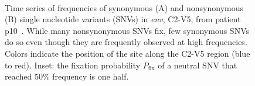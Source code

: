 \documentclass[11pt]{article}
\newcommand{\pfix}{P_{\mathrm{fix}}}
\newcommand{\env}{\textit{env}}
\newcommand{\shankaregion}{C2-V5}
\begin{document}




\begin{figure}
\begin{center}
\\
\caption{Time series of frequencies
of synonymous (A) and nonsynonymous (B) single nucleotide variants (SNVs) in \env, 
\shankaregion, from patient p10~\cite{shankarappa_consistent_1999}.
While many nonsynonymous SNVs fix, few synonymous
SNVs do so even though they are frequently observed at high
frequencies. Colors indicate the position of the site along the \shankaregion{} region
(blue to red). Inset: the fixation probability $\pfix$ of a neutral
SNV that reached 50\% frequency is one half.}
\label{fig:aft}
\end{center}
\end{figure}
\end{document}
